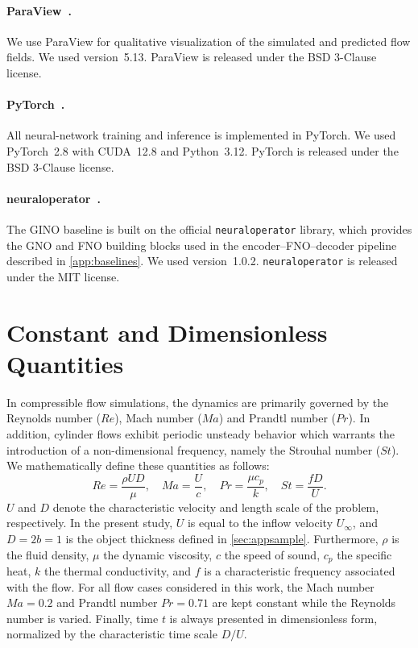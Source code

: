 \documentclass{article}
\begin{document}
\paragraph{ParaView~\citep{ParaView}.} We use ParaView for qualitative visualization of the simulated and predicted flow fields. We used version~5.13. ParaView is released under the BSD 3-Clause license. 

\paragraph{PyTorch~\citep{Ansel_PyTorch_2_Faster_2024}.} All neural-network training and inference is implemented in PyTorch. We used PyTorch~2.8 with CUDA~12.8 and Python~3.12. PyTorch is released under the BSD 3-Clause license.                                     

\paragraph{neuraloperator~\citep{kossaifi2025librarylearningneuraloperators}.} The GINO baseline is built on the official \texttt{neuraloperator} library, which provides the GNO and FNO building blocks used in the encoder--FNO--decoder pipeline described in \autoref{app:baselines}. We used version~1.0.2. \texttt{neuraloperator} is released under the MIT license.


\section{Constant and Dimensionless Quantities} \label{sec:appquan}
In compressible flow simulations, the dynamics are primarily governed by the Reynolds number ($Re$), Mach number ($Ma$) and Prandtl number ($Pr$). In addition, cylinder flows exhibit periodic unsteady behavior which warrants the introduction of a non-dimensional frequency, namely the Strouhal number ($St$). We mathematically define these quantities as follows:
\begin{equation}
    Re = \frac{\rho U D}{\mu}, \quad
    Ma = \frac{U}{c}, \quad
    Pr = \frac{\mu c_p}{k}, \quad
    St = \frac{f D}{U}.
\end{equation}
$U$ and $D$ denote the characteristic velocity and length scale of the problem, respectively. In the present study, $U$ is equal to the inflow velocity $U_\infty$, and \textcolor{revcolor}{$D = 2b = 1$ is the object thickness defined in \autoref{sec:appsample}}. Furthermore, $\rho$ is the fluid density, $
\mu$ the dynamic viscosity, $c$ the speed of sound, $c_p$ the specific heat, $k$ the thermal conductivity, and $f$ is a characteristic frequency associated with the flow. For all flow cases considered in this work, the Mach number $Ma = 0.2$ and Prandtl number $Pr = 0.71$ are kept constant while the Reynolds number is varied. Finally, time $t$ is always presented in dimensionless form, normalized by the characteristic time scale $D/U$.
\end{document}
